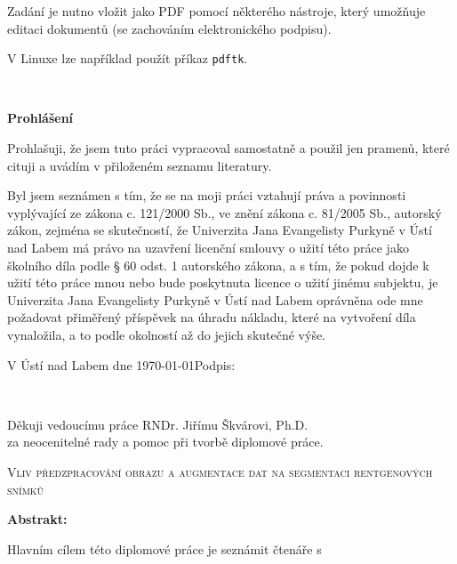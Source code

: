 \documentclass[male,czech,api_ing]{thesis}
\newcommand{\nazevcz}{Vliv předzpracování obrazu a augmentace dat na segmentaci rentgenových snímků}        %
\newcommand{\vedouciDAT}{RNDr. Jiřímu Škvárovi, Ph.D.}
\begin{document}
Zadání je nutno vložit jako PDF pomocí některého nástroje, který umožňuje editaci dokumentů (se zachováním
elektronického podpisu).

V Linuxe lze například použít příkaz \texttt{pdftk}.

\clearpage
\thispagestyle{empty}

\afterpage{\nopagecolor}
~
\clearpage

\thispagestyle{empty} 
{\bfseries Prohlášení}

\vspace{0.5cm}
Prohlašuji, že jsem tuto  práci vypracoval
samostatně a použil
jen pramenů, které cituji a uvádím v přiloženém seznamu literatury.

\vspace{0.5em}

Byl jsem seznámen 
s tím, že se na moji práci vztahují práva a povinnosti vyplývající ze
zákona c. 121/2000 Sb., ve znění zákona c. 81/2005 Sb., autorský zákon, zejména se
skutečností, že Univerzita Jana Evangelisty Purkyně v Ústí nad Labem má právo na uzavření
licenční smlouvy o užití této práce jako školního díla podle § 60 odst. 1 autorského zákona, a
s tím, že pokud dojde k užití této práce mnou nebo bude poskytnuta licence o užití jinému
subjektu, je Univerzita Jana Evangelisty Purkyně v Ústí nad Labem oprávněna ode mne
požadovat přiměřený příspěvek na úhradu nákladu, které na vytvoření díla vynaložila, a to
podle okolností až do jejich skutečné výše.

\vspace{2em}

V Ústí nad Labem dne \today   \hfill Podpis: \makebox[4cm][s]{\dotfill}

\cleardoublepage
\thispagestyle{empty}
~
\vfill

\begin{flushright}
    Děkuji vedoucímu práce {\vedouciDAT}\\ 
    za neocenitelné rady a pomoc při tvorbě diplomové práce.
\end{flushright}

\cleardoublepage

\textsc{\nazevcz}

\textbf{Abstrakt:}

Hlavním cílem této diplomové práce je seznámit čtenáře s 
\end{document}
